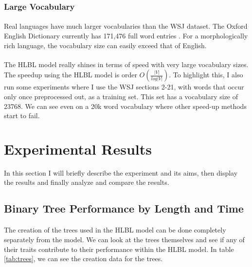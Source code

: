 \documentclass[12pt]{ociamthesis}  %
\begin{document}
\subsubsection{Large Vocabulary}
\paragraph{}
Real languages have much larger vocabularies than the WSJ dataset. The Oxford English Dictionary currently has 171,476 full word entries \cite{OED}. For a morphologically rich language, the vocabulary size can easily exceed that of English.
\paragraph{}
The HLBL model really shines in terms of speed with very large vocabulary sizes. The speedup using the HLBL model is order $O(\frac{|V|}{log|V|})$. To highlight this, I also run some experiments where I use the WSJ sections 2-21, with words that occur only once preprocessed out, as a training set. This set has a vocabulary size of 23768. We can see even on a 20k word vocabulary where other speed-up methods start to fail.


\section{Experimental Results}
\paragraph{}
In this section I will briefly describe the experiment and its aims, then display the results and finally analyze and compare the results.

\subsection{Binary Tree Performance by Length and Time}
\paragraph{}
The creation of the trees used in the HLBL model can be done completely separately from the model. We can look at the trees themselves and see if any of their traits contribute to their performance within the HLBL model.  In table \ref{tab:trees}, we can see the creation data for the trees. 
\end{document}
